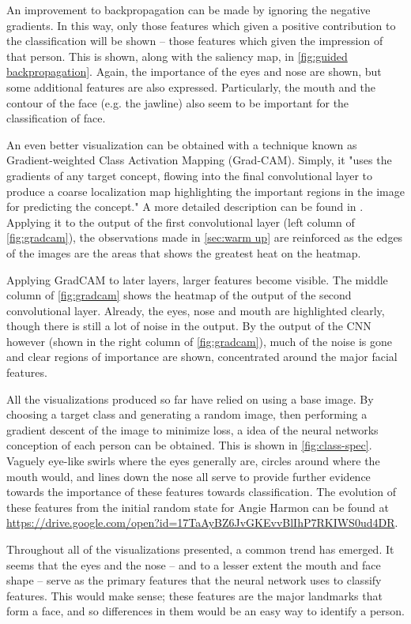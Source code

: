 \documentclass{article}
\begin{document}
An improvement to backpropagation can be made by ignoring the negative gradients. In this way, only those features which given a positive contribution to the classification will be shown -- those features which given the impression of that person. This is shown, along with the saliency map, in \cref{fig:guided backpropagation}. Again, the importance of the eyes and nose are shown, but some additional features are also expressed. Particularly, the mouth and the contour of the face (e.g. the jawline) also seem to be important for the classification of face.

An even better visualization can be obtained with a technique known as Gradient-weighted Class Activation Mapping (Grad-CAM). Simply, it "uses the gradients of any target concept, flowing into the final convolutional layer to produce a coarse localization map highlighting the important regions in the image for predicting the concept." A more detailed description can be found in \cite{DBLP:journals/corr/SelvarajuDVCPB16}. Applying it to the output of the first convolutional layer (left column of \cref{fig:gradcam}), the observations made in \cref{sec:warm up} are reinforced as the edges of the images are the areas that shows the greatest heat on the heatmap.

Applying GradCAM to later layers, larger features become visible. The middle column of \cref{fig:gradcam} shows the heatmap of the output of the second convolutional layer. Already, the eyes, nose and mouth are highlighted clearly, though there is still a lot of noise in the output. By the output of the CNN however (shown in the right column of \cref{fig:gradcam}), much of the noise is gone and clear regions of importance are shown, concentrated around the major facial features.

All the visualizations produced so far have relied on using a base image. By choosing a target class and generating a random image, then performing a gradient descent of the image to minimize loss, a idea of the neural networks conception of each person can be obtained. This is shown in \cref{fig:class-spec}. Vaguely eye-like swirls where the eyes generally are, circles around where the mouth would, and lines down the nose all serve to provide further evidence towards the importance of these features towards classification. The evolution of these features from the initial random state for Angie Harmon can be found at \url{https://drive.google.com/open?id=17TaAyBZ6JvGKEvvBlIhP7RKIWS0ud4DR}.

Throughout all of the visualizations presented, a common trend has emerged. It seems that the eyes and the nose -- and to a lesser extent the mouth and face shape -- serve as the primary features that the neural network uses to classify features. This would make sense; these features are the major landmarks that form a face, and so differences in them would be an easy way to identify a person.
\end{document}
